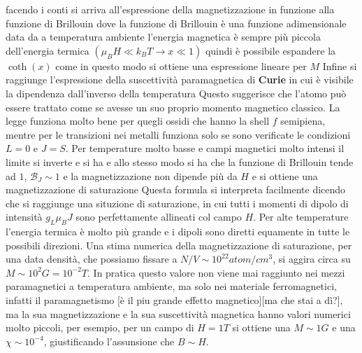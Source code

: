 facendo i conti si arriva all'espressione della magnetizzazione in funzione alla funzione di Brillouin
dove la funzione di Brillouin è una funzione adimensionale data da
a temperatura ambiente l'energia magnetica è sempre più piccola dell'energia termica $(\mu_B H \ll k_BT \to x\ll 1)$ quindi è possibile espandere la $\coth(x)$ come  
in questo modo si ottiene una espressione lineare per $M$
Infine si raggiunge l'espressione della suscettività paramagnetica di \textbf{Curie} in cui è visibile la dipendenza dall'inverso della temperatura
Questo suggerisce che l'atomo può essere trattato come se avesse un suo proprio momento magnetico classico. La legge funziona molto bene per quegli ossidi che hanno la shell $f$ semipiena, mentre per le transizioni nei metalli funziona solo se sono verificate le condizioni $L=0$ e $J=S$. Per temperature molto basse e campi magnetici molto intensi il limite si inverte e si ha
e allo stesso modo si ha che la funzione di Brillouin tende ad $1$, $\mathcal{B}_J \sim 1$ e la magnetizzazione non dipende più da $H$ e si ottiene una magnetizzazione di saturazione
Questa formula si interpreta facilmente dicendo che si raggiunge una situzione di saturazione, in cui tutti i momenti di dipolo di intensit\`a $g_L \mu_B J$ sono perfettamente allineati col campo $H$. Per alte temperature l'energia termica \`e molto pi\`u grande e i dipoli sono diretti equamente in tutte le possibili direzioni. Una stima numerica della magnetizzazione di saturazione, per una data densit\`a, che possiamo fissare a $N/V\sim 10^{22} atom/cm^{3}$, si aggira circa su $M\sim10^2 G = 10^{-2}T$. In pratica questo valore non viene mai raggiunto nei mezzi paramagnetici a temperatura ambiente, ma solo nei materiale ferromagnetici, infatti il paramagnetismo [\`e il piu grande effetto magnetico][ma che stai a d\`i?], ma la sua magnetizzazione e la sua suscettivit\`a magnetica hanno valori numerici molto piccoli, per esempio, per un campo di $H=1T$ si ottiene una $M\sim 1G$ e una $\chi \sim 10^{-4}$, giustificando l'assunsione che $B\sim H$.

